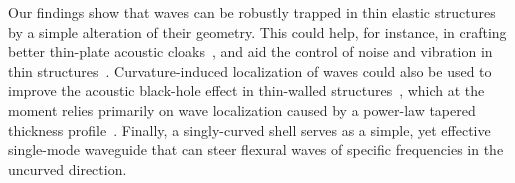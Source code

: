 Our findings show that waves can be robustly trapped in thin elastic structures by a simple alteration of their geometry.
This could help, for instance, in crafting better thin-plate acoustic cloaks~\cite{farhat2009}, and aid the control of noise and vibration in thin structures~\cite{mace1987,hansen2012}.
Curvature-induced localization of waves could also be used to improve the acoustic black-hole effect in thin-walled structures~\cite{lee2017,pelat2020}, which at the moment relies primarily on wave localization caused by a power-law tapered thickness profile~\cite{krylov2020}.
Finally, a singly-curved shell serves as a simple, yet effective single-mode waveguide that can steer flexural waves of specific frequencies in the uncurved direction.


